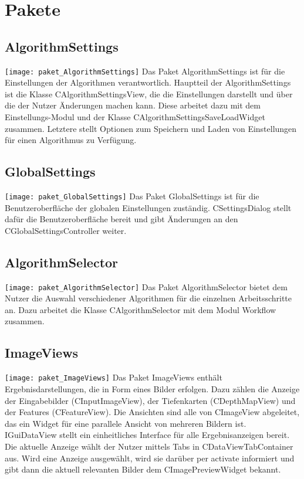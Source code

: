 \section{Pakete}

\subsection{AlgorithmSettings}
\texttt{[image: paket\_AlgorithmSettings]}
Das Paket AlgorithmSettings ist für die Einstellungen der Algorithmen verantwortlich. Hauptteil der AlgorithmSettings ist die Klasse CAlgorithmSettingsView, die die Einstellungen darstellt und über die der Nutzer Änderungen machen kann. Diese arbeitet dazu mit dem Einstellungs-Modul und der Klasse CAlgorithmSettingsSaveLoadWidget zusammen. Letztere stellt Optionen zum Speichern und Laden von Einstellungen für einen Algorithmus zu Verfügung.

\subsection{GlobalSettings}
\texttt{[image: paket\_GlobalSettings]}
Das Paket GlobalSettings ist für die Benutzeroberfläche der globalen Einstellungen zuständig. CSettingsDialog stellt dafür die Benutzeroberfläche bereit und gibt Änderungen an den CGlobalSettingsController weiter.

\subsection{AlgorithmSelector}
\texttt{[image: paket\_AlgorithmSelector]}
Das Paket AlgorithmSelector bietet dem Nutzer die Auswahl verschiedener Algorithmen für die einzelnen Arbeitsschritte an. Dazu arbeitet die Klasse CAlgorithmSelector mit dem Modul Workflow zusammen.

\subsection{ImageViews}
\texttt{[image: paket\_ImageViews]}
Das Paket ImageViews enthält Ergebnisdarstellungen, die in Form eines Bilder erfolgen. Dazu zählen die Anzeige der Eingabebilder (CInputImageView), der Tiefenkarten (CDepthMapView) und der Features (CFeatureView). Die Ansichten sind alle von CImageView abgeleitet, das ein Widget für eine parallele Ansicht von mehreren Bildern ist. IGuiDataView stellt ein einheitliches Interface für alle Ergebnisanzeigen bereit. Die aktuelle Anzeige wählt der Nutzer mittels Tabs in CDataViewTabContainer aus. Wird eine Anzeige ausgewählt, wird sie darüber per activate informiert und gibt dann die aktuell relevanten Bilder dem CImagePreviewWidget bekannt.


